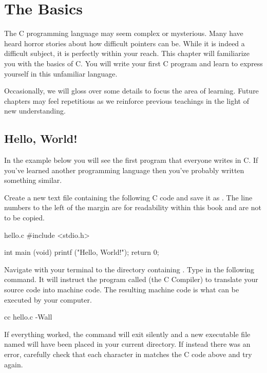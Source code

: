 \chapter{The Basics}

The C programming language may seem complex or mysterious.  Many have heard
horror stories about how difficult pointers can be. While it is indeed a
difficult subject, it is perfectly within your reach.  This chapter will
familiarize you with the basics of C.  You will write your first C program and
learn to express yourself in this unfamiliar language.

Occasionally, we will gloss over some details to focus the area of learning.
Future chapters may feel repetitious as we reinforce previous teachings in the
light of new understanding.

\section{Hello, World!}

In the example below you will see the first program that everyone writes in C.
If you've learned another programming language then you've probably written
something similar.

Create a new text file containing the following C code and save it as
.  The line numbers to the left of the margin are for readability
within this book and are not to be copied.

\begin{code}{hello.c}
#include <stdio.h>

int
main (void)
{
    printf ("Hello, World!\n");
    return 0;
}
\end{code}

Navigate with your terminal to the directory containing . Type in
the following command. It will instruct the program called  (the C
Compiler) to translate your source code into machine code. The resulting
machine code is what can be executed by your computer.

\begin{Terminal}
cc hello.c -Wall
\end{Terminal}

If everything worked, the  command will exit silently and a new
executable file named  will have been placed in your current
directory. If instead there was an error, carefully check that each character in
 matches the C code above and try again.

